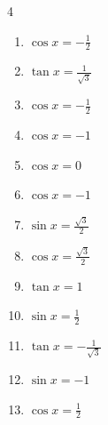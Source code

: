 \begin{multicols}{4}
\begin{enumerate}
  \item $\displaystyle \cos{x}  = -\frac{1}{2}$


  \item $\displaystyle \tan{x}  = \frac{1}{\sqrt{3}}$


  \item $\displaystyle \cos{x}  = -\frac{1}{2}$


  \item $\displaystyle \cos{x}  = -1$

        \phantom{$\displaystyle x = \pi$}

  \item $\displaystyle \cos{x}  = 0$


  \item $\displaystyle \cos{x}  = -1$

        \phantom{$\displaystyle x = \pi$}

  \item $\displaystyle \sin{x}  = \frac{\sqrt{3}}{2}$


  \item $\displaystyle \cos{x}  = \frac{\sqrt{3}}{2}$


  \item $\displaystyle \tan{x}  = 1$


  \item $\displaystyle \sin{x}  = \frac{1}{2}$


  \item $\displaystyle \tan{x}  = -\frac{1}{\sqrt{3}}$


  \item $\displaystyle \sin{x}  = -1$


  \item $\displaystyle \cos{x}  = \frac{1}{2}$


\end{enumerate}
\end{multicols}

